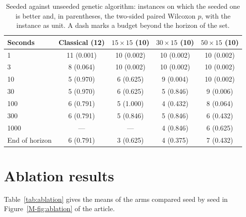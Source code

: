 \documentclass[11pt]{article}
\begin{document}
\begin{table}[!htb]
\centering\small
\caption{Seeded against unseeded genetic algorithm: instances on which the
seeded one is better and, in parentheses, the two-sided paired Wilcoxon
$p$, with the instance as unit. A dash marks a budget beyond the horizon
of the set.}
\label{tab:semilla}
\begin{tabular}{lcccc}
\toprule
Seconds & Classical (12) & $15{\times}15$ (10) & $30{\times}15$ (10) & $50{\times}15$ (10) \\
\midrule
1 & 11 (0.001) & 10 (0.002) & 10 (0.002) & 10 (0.002) \\
3 & 8 (0.064) & 10 (0.002) & 10 (0.002) & 10 (0.002) \\
10 & 5 (0.970) & 6 (0.625) & 9 (0.004) & 10 (0.002) \\
30 & 5 (0.970) & 6 (0.625) & 5 (0.846) & 9 (0.006) \\
100 & 6 (0.791) & 5 (1.000) & 4 (0.432) & 8 (0.064) \\
300 & 6 (0.791) & 5 (0.846) & 5 (0.846) & 6 (0.432) \\
1000 & --- & --- & 4 (0.846) & 6 (0.625) \\
End of horizon & 6 (0.791) & 3 (0.625) & 4 (0.375) & 7 (0.432) \\
\bottomrule
\end{tabular}
\end{table}

\section{Ablation results}
\label{sec:ablationtab}

Table~\ref{tab:ablation} gives the means of the arms compared seed by
seed in Figure~\ref{M-fig:ablation} of the article.
\end{document}
